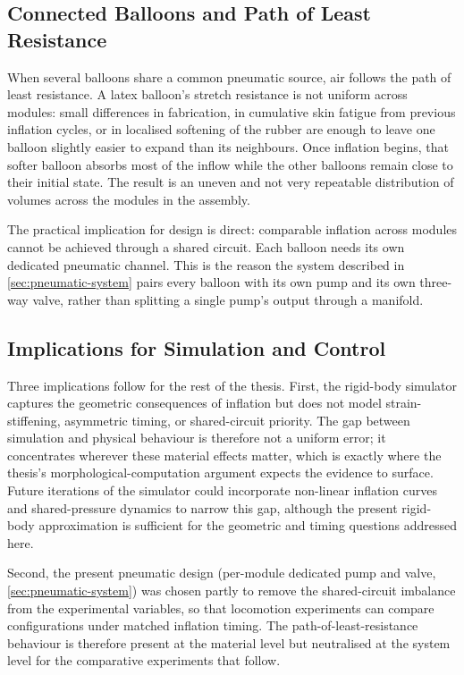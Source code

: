 \subsection{Connected Balloons and Path of Least Resistance}
\label{subsec:shared-circuit}

When several balloons share a common pneumatic source, air follows the path of least resistance. A latex balloon's stretch resistance is not uniform across modules: small differences in fabrication, in cumulative skin fatigue from previous inflation cycles, or in localised softening of the rubber are enough to leave one balloon slightly easier to expand than its neighbours. Once inflation begins, that softer balloon absorbs most of the inflow while the other balloons remain close to their initial state. The result is an uneven and not very repeatable distribution of volumes across the modules in the assembly.

The practical implication for design is direct: comparable inflation across modules cannot be achieved through a shared circuit. Each balloon needs its own dedicated pneumatic channel. This is the reason the system described in \cref{sec:pneumatic-system} pairs every balloon with its own pump and its own three-way valve, rather than splitting a single pump's output through a manifold.

\subsection{Implications for Simulation and Control}
\label{subsec:material-implications}

Three implications follow for the rest of the thesis. First, the rigid-body simulator captures the geometric consequences of inflation but does not model strain-stiffening, asymmetric timing, or shared-circuit priority. The gap between simulation and physical behaviour is therefore not a uniform error; it concentrates wherever these material effects matter, which is exactly where the thesis's morphological-computation argument expects the evidence to surface. Future iterations of the simulator could incorporate non-linear inflation curves and shared-pressure dynamics to narrow this gap, although the present rigid-body approximation is sufficient for the geometric and timing questions addressed here.

Second, the present pneumatic design (per-module dedicated pump and valve, \cref{sec:pneumatic-system}) was chosen partly to remove the shared-circuit imbalance from the experimental variables, so that locomotion experiments can compare configurations under matched inflation timing. The path-of-least-resistance behaviour is therefore present at the material level but neutralised at the system level for the comparative experiments that follow.

